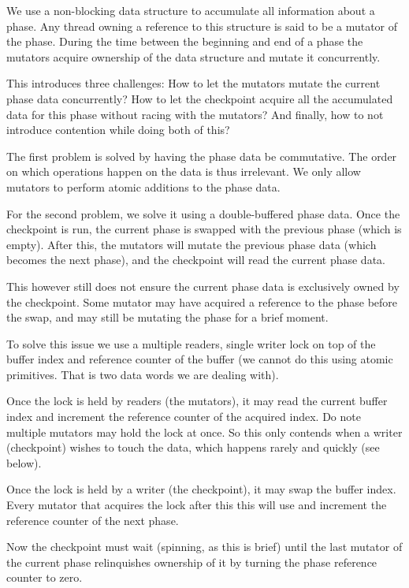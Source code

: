 We use a non-blocking data structure to accumulate all information about a phase. Any thread owning a reference to this structure is said to be a mutator of the phase. During the time between the beginning and end of a phase the mutators acquire ownership of the data structure and mutate it concurrently.

This introduces three challenges: How to let the mutators mutate the current phase data concurrently? How to let the checkpoint acquire all the accumulated data for this phase without racing with the mutators? And finally, how to not introduce contention while doing both of this?

The first problem is solved by having the phase data be commutative. The order on which operations happen on the data is thus irrelevant. We only allow mutators to perform atomic additions to the phase data.

For the second problem, we solve it using a double-buffered phase data. Once the checkpoint is run, the current phase is swapped with the previous phase (which is empty). After this, the mutators will mutate the previous phase data (which becomes the next phase), and the checkpoint will read the current phase data.

This however still does not ensure the current phase data is exclusively owned by the checkpoint. Some mutator may have acquired a reference to the phase before the swap, and may still be mutating the phase for a brief moment.

To solve this issue we use a multiple readers, single writer lock on top of the buffer index and reference counter of the buffer (we cannot do this using atomic primitives. That is two data words we are dealing with).

Once the lock is held by readers (the mutators), it may read the current buffer index and increment the reference counter of the acquired index. Do note multiple mutators may hold the lock at once. So this only contends when a writer (checkpoint) wishes to touch the data, which happens rarely and quickly (see below).

Once the lock is held by a writer (the checkpoint), it may swap the buffer index. Every mutator that acquires the lock after this this will use and increment the reference counter of the next phase.

Now the checkpoint must wait (spinning, as this is brief) until the last mutator of the current phase relinquishes ownership of it by turning the phase reference counter to zero.

